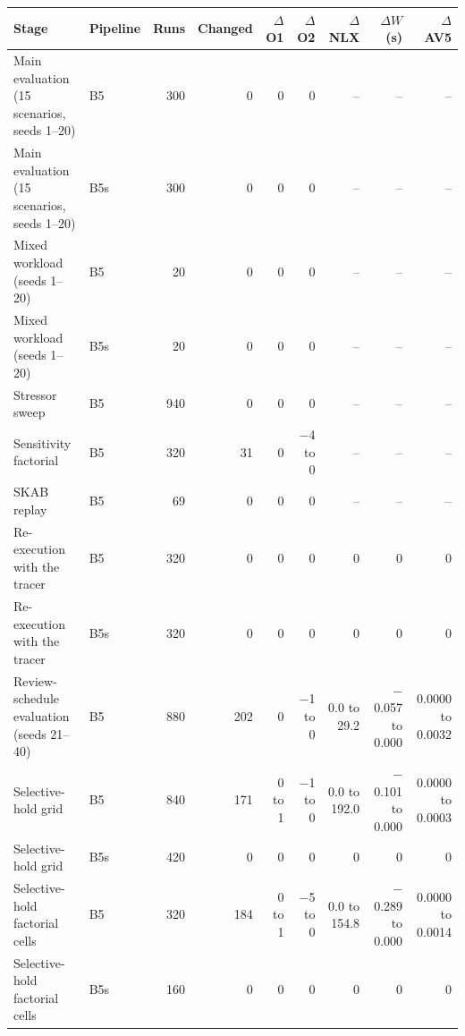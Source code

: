 \begin{tabularx}{\linewidth}{@{}>{\raggedright\arraybackslash}X lrrrrrrr@{}}
\toprule
Stage & Pipeline & Runs & Changed & $\Delta$O1 & $\Delta$O2 & $\Delta$NLX & $\Delta W$ (s) & $\Delta$AV5\\
\midrule
Main evaluation (15 scenarios, seeds 1--20) & B5 & 300 & 0 & 0 & 0 & -- & -- & --\\
Main evaluation (15 scenarios, seeds 1--20) & B5s & 300 & 0 & 0 & 0 & -- & -- & --\\
Mixed workload (seeds 1--20) & B5 & 20 & 0 & 0 & 0 & -- & -- & --\\
Mixed workload (seeds 1--20) & B5s & 20 & 0 & 0 & 0 & -- & -- & --\\
Stressor sweep & B5 & 940 & 0 & 0 & 0 & -- & -- & --\\
Sensitivity factorial & B5 & 320 & 31 & 0 & $-$4 to 0 & -- & -- & --\\
SKAB replay & B5 & 69 & 0 & 0 & 0 & -- & -- & --\\
Re-execution with the tracer & B5 & 320 & 0 & 0 & 0 & 0 & 0 & 0\\
Re-execution with the tracer & B5s & 320 & 0 & 0 & 0 & 0 & 0 & 0\\
Review-schedule evaluation (seeds 21--40) & B5 & 880 & 202 & 0 & $-$1 to 0 & 0.0 to 29.2 & $-$0.057 to 0.000 & 0.0000 to 0.0032\\
Selective-hold grid & B5 & 840 & 171 & 0 to 1 & $-$1 to 0 & 0.0 to 192.0 & $-$0.101 to 0.000 & 0.0000 to 0.0003\\
Selective-hold grid & B5s & 420 & 0 & 0 & 0 & 0 & 0 & 0\\
Selective-hold factorial cells & B5 & 320 & 184 & 0 to 1 & $-$5 to 0 & 0.0 to 154.8 & $-$0.289 to 0.000 & 0.0000 to 0.0014\\
Selective-hold factorial cells & B5s & 160 & 0 & 0 & 0 & 0 & 0 & 0\\
\bottomrule
\end{tabularx}
